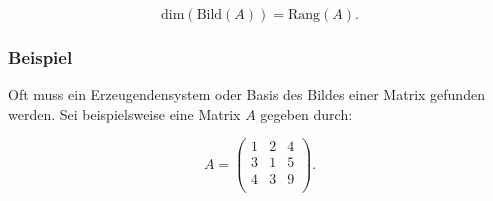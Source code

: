 \begin{equation*}
    \text{dim}(\text{Bild}(A)) = \text{Rang}(A).
\end{equation*}

\vspace{0.25\baselineskip}

\subsubsection*{Beispiel}

Oft muss ein Erzeugendensystem oder Basis des Bildes einer Matrix gefunden werden. Sei beispielsweise eine Matrix \( A \) gegeben durch:

\begin{equation*}
    A = \begin{pmatrix}
        1 & 2 & 4 \\
        3 & 1 & 5 \\
        4 & 3 & 9 \\
    \end{pmatrix}.
\end{equation*}

